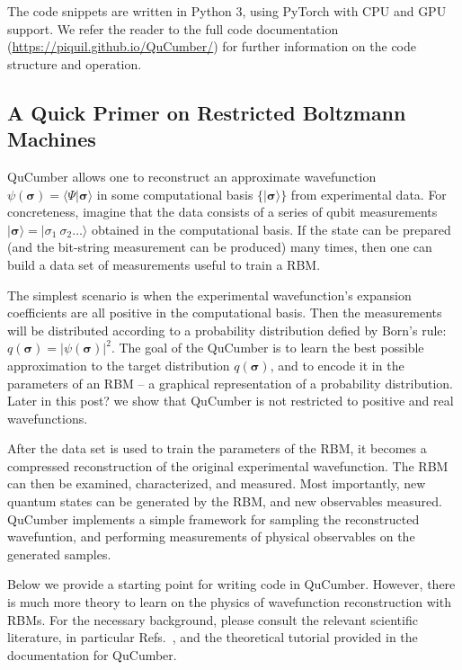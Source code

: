 \documentclass[submission, Phys]{SciPost}
\begin{document}
The code snippets are written in Python 3, using PyTorch with CPU and GPU support.  We refer the reader to the full code documentation (\url{https://piquil.github.io/QuCumber/}) for further information on the code structure and operation.


\subsection{A Quick Primer on Restricted Boltzmann Machines}

QuCumber allows one to reconstruct an approximate wavefunction $\psi( \boldsymbol{\sigma} )  = \langle \Psi \vert \boldsymbol{\sigma} \rangle$ in some computational basis $\{ \vert \boldsymbol{ \sigma} \rangle \}$ from experimental data.   For concreteness, imagine that the data consists of a series of qubit measurements $\vert {\boldsymbol{ \sigma}} \rangle = \vert { \sigma}_1~{ \sigma}_2 \dots \rangle$ obtained in the computational basis. If the state can be prepared (and the bit-string measurement can be produced) many times, then one can build a data set of measurements useful to train a RBM.

The simplest scenario is when the experimental wavefunction's expansion coefficients are all positive in the computational basis.  
Then the measurements will be distributed according to a probability distribution defied by Born's rule: $q(\boldsymbol{\sigma}) = | \psi( \boldsymbol{\sigma} ) |^2$.
The goal of the QuCumber is to learn the best possible approximation to the target distribution $q(\boldsymbol{\sigma})$, and to encode it in the parameters of an RBM -- a graphical representation of a probability distribution. Later in this post? we show that QuCumber is not restricted to positive and real wavefunctions.

After the data set is used to train the parameters of the RBM, it becomes a compressed reconstruction of the original experimental wavefunction.  The RBM can then be examined, characterized, and measured.  Most importantly, new quantum states can be generated by the RBM, and new observables measured.  QuCumber implements a simple framework for sampling the reconstructed wavefuntion, and performing measurements of physical observables on the generated samples.

Below we provide a starting point for writing code in QuCumber.  However, there is much more theory to learn on the physics of wavefunction reconstruction with RBMs. For the necessary background, please consult the relevant scientific literature, in particular Refs.~\cite{Torlai2016thermo, torlai2018tomography, CarleoTroyer2017Science}, and the theoretical tutorial provided in the documentation for QuCumber.  
\end{document}
